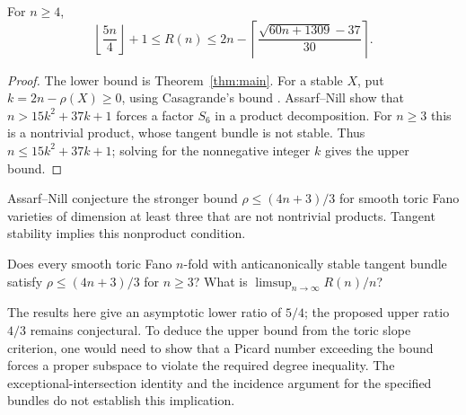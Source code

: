 \begin{corollary}\label{cor:publishedbound}
For $n\ge4$,
\[
 \left\lfloor\frac{5n}{4}\right\rfloor+1\le R(n)\le
 2n-\left\lceil\frac{\sqrt{60n+1309}-37}{30}\right\rceil.
\]
\end{corollary}
\begin{proof}
The lower bound is Theorem~\ref{thm:main}. For a stable $X$, put
$k=2n-\rho(X)\ge0$, using Casagrande's bound
\cite{Casagrande2006}. Assarf--Nill
\cite[Theorem~8]{AssarfNill2016} show that
$n>15k^2+37k+1$ forces a factor $S_6$ in a product decomposition.
For $n\ge3$ this is a nontrivial product, whose tangent bundle is
not stable. Thus $n\le15k^2+37k+1$; solving for the nonnegative
integer $k$ gives the upper bound.
\end{proof}

Assarf--Nill \cite[Conjecture~13]{AssarfNill2016} conjecture the
stronger bound $\rho\le(4n+3)/3$ for smooth toric Fano varieties of
dimension at least three that are not nontrivial products. Tangent
stability implies this nonproduct condition.
\begin{question}
Does every smooth toric Fano $n$-fold with anticanonically stable
tangent bundle satisfy $\rho\le(4n+3)/3$ for $n\ge3$? What is
$\limsup_{n\to\infty}R(n)/n$?
\end{question}

The results here give an asymptotic lower ratio of $5/4$; the proposed
upper ratio $4/3$ remains conjectural. To deduce the upper bound from
the toric slope criterion, one would need to show that a Picard number
exceeding the bound forces a proper subspace to violate the required
degree inequality. The exceptional-intersection identity and the
incidence argument for the specified bundles do not establish this
implication.
